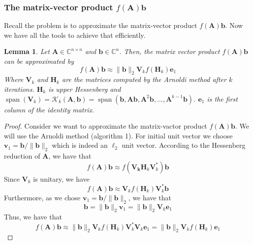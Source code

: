 \documentclass[11pt]{article}
\DeclareMathOperator{\spn}{span}
\newtheorem{lemma}{Lemma}[section]
\numberwithin{equation}{section}
\begin{document}
\subsubsection{The matrix-vector product $f(\mathbf{A})\mathbf{b}$}
Recall the problem is to approximate the matrix-vector product $f(\mathbf{A})\mathbf{b}$. Now we have all the tools to achieve that efficiently.  
\begin{lemma}\label{lem:arnoldi1}
    Let $\mathbf{A}\in\mathbb{C}^{n\times n}$ and $\mathbf{b}\in\mathbb{C}^n$. Then, the matrix vector product $f(\mathbf{A})\mathbf{b}$ can be approximated by
    \begin{equation}
        f(\mathbf{A})\mathbf{b} \approx \|\mathbf{b}\|_2\mathbf{V}_k f(\mathbf{H}_k)\mathbf{e}_1
    \end{equation}
    Where $\mathbf{V}_k$ and $\mathbf{H}_k$ are the matrices computed by the Arnoldi method after $k$ iterations. $\mathbf{H}_k$ is upper Hessenberg and $\spn{\left(\mathbf{V}_k\right)}=\mathcal{K}_k(\mathbf{A},\mathbf{b}) = \spn{\left(\mathbf{b}, \mathbf{A}\mathbf{b}, \mathbf{A}^2\mathbf{b}, \dots, \mathbf{A}^{k-1}\mathbf{b}\right)}$. $\mathbf{e}_1$ is the first column of the identity matrix.
\end{lemma}
\begin{proof}
    Consider we want to approximate the matrix-vactor product $f(\mathbf{A})\mathbf{b}$. We will use the Arnoldi method (algorithm 1). For initial unit vector we choose $\mathbf{v}_1 = \mathbf{b}/\|\mathbf{b}\|_2$ which is indeed an $\ell_2$ unit vector. According to the Hessenberg reduction of $\mathbf{A}$, we have that
    \begin{equation*}
        f(\mathbf{A})\mathbf{b} \approx f(\mathbf{V_k}\mathbf{H}_k\mathbf{V}_k^*)\mathbf{b}
    \end{equation*}
    Since $\mathbf{V}_k$ is unitary, we have
    \begin{equation*}
        f(\mathbf{A})\mathbf{b} \approx \mathbf{V}_k f(\mathbf{H}_k)\mathbf{V}_k^*\mathbf{b}
    \end{equation*}
    Furthermore, as we chose $\mathbf{v}_1 = \mathbf{b}/\|\mathbf{b}\|_2$, we have that
    \begin{equation*}
        \mathbf{b} = \|\mathbf{b}\|_2\mathbf{v}_1 = \|\mathbf{b}\|_2\mathbf{V}_k\mathbf{e}_1
    \end{equation*}
    Thus, we have that
    \begin{equation*}
        f(\mathbf{A})\mathbf{b} \approx \|\mathbf{b}\|_2\mathbf{V}_k f(\mathbf{H}_k)\mathbf{V}_k^*\mathbf{V}_k\mathbf{e}_1 = \|\mathbf{b}\|_2\mathbf{V}_k f(\mathbf{H}_k)\mathbf{e}_1
    \end{equation*}
\end{proof}
\end{document}
